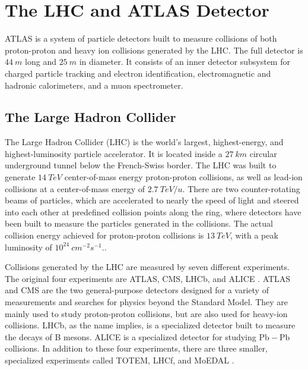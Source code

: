 \chapter{The LHC and ATLAS Detector}\label{ch:atlas}

ATLAS is a system of particle detectors built to measure collisions of both proton-proton and heavy ion collisions
generated by the LHC.\cite{atlas-detector-2008}
The full detector is $44~m$ long and $25~m$ in diameter.
It consists of an inner detector subsystem for charged particle tracking and electron identification,
electromagnetic and hadronic calorimeters, and a muon spectrometer.

\section{The Large Hadron Collider}\label{sec:lhc}

The Large Hadron Collider (LHC) is the world's largest, highest-energy, and highest-luminosity particle accelerator.
It is located inside a $27~km$ circular underground tunnel below the French-Swiss border.
The LHC was built to generate $14~TeV$ center-of-mass energy proton-proton collisions,
as well as lead-ion collisions at a center-of-mass energy of $2.7~TeV/u$.
There are two counter-rotating beams of particles,
which are accelerated to nearly the speed of light and steered into each other at predefined collision points along the ring,
where detectors have been built to measure the particles generated in the collisions.
The actual collision energy achieved for proton-proton collisions is $13~TeV$,
with a peak luminosity of $10^{24}~cm^{-2}s^{-1}$.\cite{lhc-guide-2017}.

Collisions generated by the LHC are measured by seven different experiments.
The original four experiments are ATLAS, CMS, LHCb, and ALICE .
ATLAS and CMS are the two general-purpose detectors designed for a variety of measurements and searches for physics beyond the Standard Model.
They are mainly used to study proton-proton collisions, but are also used for heavy-ion collisions.
LHCb, as the name implies, is a specialized detector built to measure the decays of B mesons.
ALICE is a specialized detector for studying $\mathrm{Pb}-\mathrm{Pb}$ collisions.
In addition to these four experiments, there are three smaller, specialized experiments called TOTEM, LHCf, and MoEDAL .

